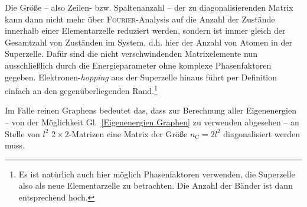 \documentclass[a4paper, 10pt, twoside, openany]{book} %
\def \nC {n_\mathrm{C}}
\begin{document}
	Die Größe -- also Zeilen- bzw. Spaltenanzahl -- der zu diagonalisierenden Matrix kann dann nicht mehr über \textsc{Fourier}-Analysis auf die Anzahl der Zustände innerhalb einer Elementarzelle reduziert werden, sondern ist immer gleich der Gesamtzahl von Zuständen im System, d.h. hier der Anzahl von Atomen in der Superzelle. Dafür sind die nicht verschwindenden Matrixelemente nun ausschließlich durch die Energieparameter ohne komplexe Phasenfaktoren gegeben. Elektronen-\emph{hopping} aus der Superzelle hinaus führt per Definition einfach an den gegenüberliegenden Rand.\footnote{Es ist natürlich auch hier möglich Phasenfaktoren verwenden, die Superzelle also als neue Elementarzelle zu betrachten. Die Anzahl der Bänder ist dann entsprechend hoch.}
	
	Im Falle reinen Graphens bedeutet das, dass zur Berechnung aller Eigenenergien -- von der Möglichkeit Gl.~\ref{Eigenenergien Graphen} zu verwenden abgesehen -- an Stelle von $l^2$ $2 \times 2$-Matrizen eine Matrix der Größe $\nC = 2 l^2$ diagonalisiert werden muss.
	
\end{document}
